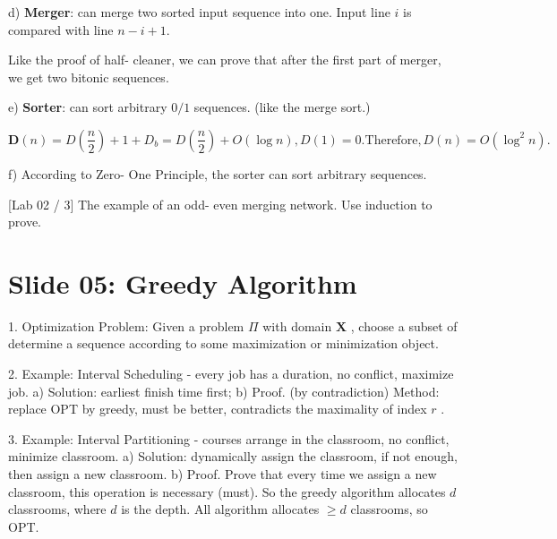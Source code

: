 \documentclass[10pt,a4paper]{article}
\begin{document}
d) \textbf{Merger}: can merge two sorted input sequence into one. Input line \(i\) is compared with line \(n - i + 1\).

\begin{center}
\end{center}

Like the proof of half- cleaner, we can prove that after the first part of merger, we get two bitonic sequences.

e) \textbf{Sorter}: can sort arbitrary \(0 / 1\) sequences. (like the merge sort.)

\begin{center}
\end{center}

\[
\mathbf{D}(n) = D\left(\frac{n}{2}\right) + 1 + D_b = D\left(\frac{n}{2}\right) + O(\log n), D(1) = 0.\mathrm{Therefore}, D(n) = O(\log^2 n).
\]

f) According to Zero- One Principle, the sorter can sort arbitrary sequences.

[Lab 02 / 3] The example of an odd- even merging network. Use induction to prove.

\section*{Slide 05: Greedy Algorithm}

1. Optimization Problem: Given a problem \(\Pi\) with domain \(\mathbf{X}\) , choose a subset of determine a sequence according to some maximization or minimization object.

2. Example: Interval Scheduling - every job has a duration, no conflict, maximize job.
a) Solution: earliest finish time first;
b) Proof. (by contradiction) Method: replace OPT by greedy, must be better, contradicts the maximality of index \(r\) .

3. Example: Interval Partitioning - courses arrange in the classroom, no conflict, minimize classroom.
a) Solution: dynamically assign the classroom, if not enough, then assign a new classroom.
b) Proof. Prove that every time we assign a new classroom, this operation is necessary (must). So the greedy algorithm allocates \(d\) classrooms, where \(d\) is the depth. All algorithm allocates \(\geq d\) classrooms, so OPT.
\end{document}
